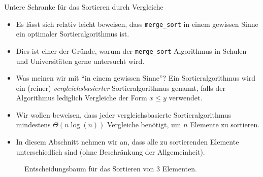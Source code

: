 \begin{frame}[fragile]{Untere Schranke für das Sortieren durch Vergleiche}
\begin{itemize}[<+->]
    \item Es lässt sich relativ leicht beweisen, dass \lstinline{merge_sort} in einem gewissen Sinne ein optimaler Sortieralgorithmus ist. 
    \item Dies ist einer der Gründe, warum der \lstinline{merge_sort} Algorithmus in Schulen und Universitäten gerne untersucht wird. 
    \item Was meinen wir mit \enquote{in einem gewissen Sinne}? Ein Sortieralgorithmus wird ein (reiner) \textit{vergleichsbasierter} Sortieralgorithmus genannt, falls der Algorithmus lediglich Vergleiche der Form $x \leq y$ verwendet.
    \item Wir wollen beweisen, dass jeder vergleichsbasierte Sortieralgorithmus mindestens $\Theta(n\log(n))$ Vergleiche benötigt, um $n$ Elemente zu sortieren. 
    \item In diesem Abschnitt nehmen wir an, dass alle zu sortierenden Elemente unterschiedlich sind (ohne Beschränkung der Allgemeinheit).
\end{itemize}
\end{frame}


\begin{frame}
\begin{figure}[H]
    \centering
    \caption{Entscheidungsbaum für das Sortieren von 3 Elementen.}
    \label{fig:decisiontree}
\end{figure}
\end{frame}


